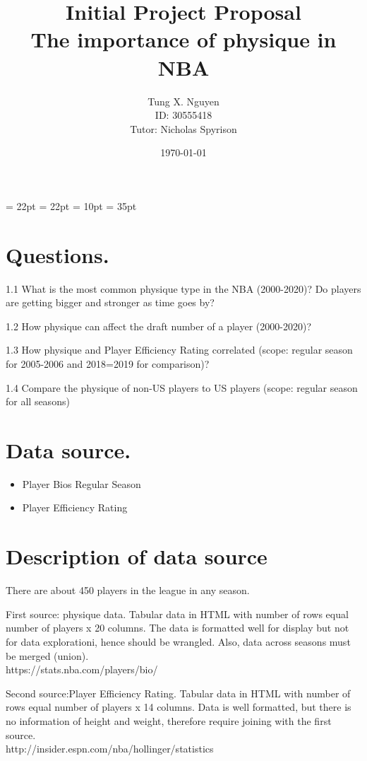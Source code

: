\documentclass[a4paper,12pt,twoside]{article}
\title{Initial Project Proposal\\The importance of physique in NBA}
\author{Tung X. Nguyen\\ID: 30555418\\Tutor: Nicholas Spyrison}
\date{\today}
\begin{document}
\maketitle
\thispagestyle{empty}
\thispagestyle{empty}

\oddsidemargin = 22pt
\evensidemargin = 22pt
\marginparsep = 10pt
\marginparwidth = 35pt


\section{Questions.}

1.1 What is the most common physique type in the NBA (2000-2020)? Do players are getting bigger and stronger as time goes by?

1.2 How physique can affect the draft number of a player (2000-2020)?

1.3 How physique and Player Efficiency Rating correlated (scope: regular season for 2005-2006 and 2018=2019 for comparison)?

1.4 Compare the physique of non-US players to US players (scope: regular season for all seasons)
 


\section{Data source.}
\begin{itemize}
\item Player Bios Regular Season 
\item Player Efficiency Rating
\end{itemize}

\section{Description of data source}
There are about 450 players in the league in any season.


First source: physique data. Tabular data in HTML with number of rows equal number of players x 20 columns. The data is formatted well for display but not for data explorationi, hence should be wrangled. Also, data across seasons must be merged (union).\\
https://stats.nba.com/players/bio/

Second source:Player Efficiency Rating. Tabular data in HTML with number of rows equal number of players x 14 columns. Data is well formatted, but there is no information of height and weight, therefore require joining with the first source.
\\http://insider.espn.com/nba/hollinger/statistics
\end{document}
